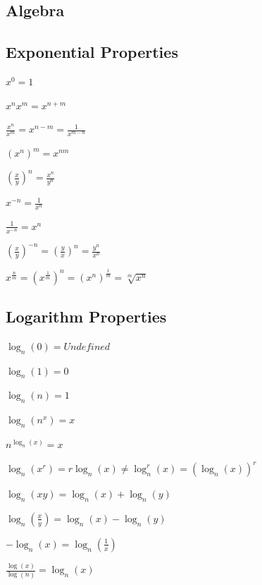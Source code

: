 \documentclass[8pt,a4paper]{extarticle}     %
\theoremstyle{definition}
\theoremstyle{definition}
\theoremstyle{definition}
\begin{document}
\begin{titlepage}
\begin{multicols}{2}
\tableofcontents
\end{multicols}
\end{titlepage}

\begin{multicols}{4}
\setcounter{page}{1}

\section{Algebra}
\subsection{Exponential Properties}
\begin{eqlist}
	\item $x^0 = 1$
	\item $x^nx^m = x^{n+m}$
	\item $\frac{x^n}{x^m} = x^{n-m} = \frac{1}{x^{m-n}}$
	\item $(x^n)^m = x^{nm}$
	\item $\left(\frac{x}{y}\right)^n = \frac{x^n}{y^n}$
	\item $x^{-n} = \frac{1}{x^n}$
	\item $\frac{1}{x^{-n}} = x^n$
	\item $\left(\frac{x}{y}\right)^{-n} = \left(\frac{y}{x}\right)^n = \frac{y^n}{x^n}$
	\item $x^{\frac{n}{m}} = \left(x^{\frac{1}{m}}\right)^n = (x^n)^{\frac{1}{m}} = \sqrt[m]{x^n}$
\end{eqlist}

\subsection{Logarithm Properties}
\begin{eqlist}
	\item $\log_n(0) = \textit{Undefined}$
	\item $\log_n(1) = 0$
	\item $\log_n(n) = 1$
	\item $\log_n(n^x) = x$
	\item $n^{\log_n(x)} = x$
	\item $\log_n(x^r) = r\log_n(x) \neq \log_n^r(x) = (\log_n(x))^r$
	\item $\log_n(xy) = \log_n(x) + \log_n(y)$
	\item $\log_n\left(\frac{x}{y}\right) = \log_n(x) - \log_n(y)$
	\item $-\log_n(x) = \log_n\left(\frac{1}{x}\right)$
	\item $\frac{\log(x)}{\log(n)} = \log_n(x)$
\end{eqlist}


\end{multicols}
\end{document}
